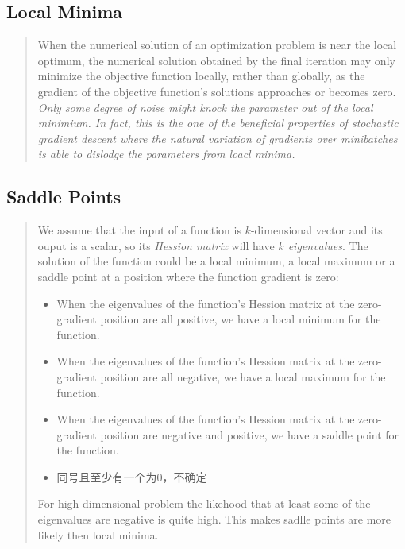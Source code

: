 \subsection{Local Minima}
\begin{quotation}
    When the numerical solution of an optimization problem is near the local optimum, the numerical
    solution obtained by the final iteration may only minimize the objective function locally, rather
    than globally, as the gradient of the objective function's solutions approaches or becomes zero.
    \textit{Only some degree of noise might knock the parameter out of the local minimium. In fact,
        this is the one of the beneficial properties of stochastic gradient descent where the natural variation
        of gradients over minibatches is able to dislodge the parameters from loacl minima.}\cite{zhang2020dive}
\end{quotation}
\subsection{Saddle Points}
\begin{quotation}
    We assume that the input of a function is $k$-dimensional vector and its ouput is a scalar,
    so its \textit{Hession matrix} will have \textit{$k$ eigenvalues}. The solution of the function could
    be a local minimum, a local maximum or a saddle point at a position where the function gradient
    is zero:
    \begin{itemize}
        \item When the eigenvalues of the function's Hession matrix at the zero-gradient position
              are all positive, we have a local minimum for the function.
        \item When the eigenvalues of the function's Hession matrix at the zero-gradient position
              are all negative, we have a local maximum for the function.
        \item When the eigenvalues of the function's Hession matrix at the zero-gradient position
              are negative and positive, we have a saddle point for the function.
        \item 同号且至少有一个为0，不确定
    \end{itemize}
    For high-dimensional problem the likehood that at least some of the eigenvalues are negative
    is quite high. This makes sadlle points are more likely then local minima.\cite{zhang2020dive}
\end{quotation}

